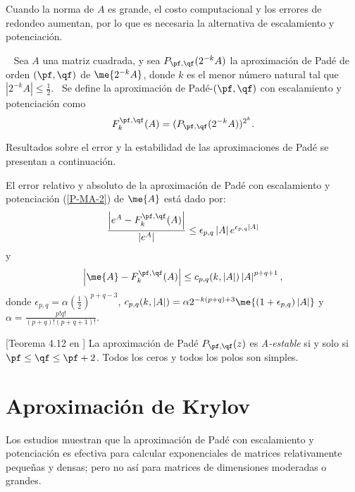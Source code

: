 Cuando la norma de $A$ es grande, el costo computacional  y los errores de redondeo aumentan, por lo que
es necesaria la alternativa de escalamiento y potenciaci\'on.

\begin{definition}\cite{Golub96}~
    Sea $A$ una matriz cuadrada, y sea $P_{\pf,\qf}(2^{-k}A%
    )$ la aproximaci\'{o}n de Pad\'{e} de orden $(\pf,\qf)\ $de $\me{2^{-k}A%
    }$, donde $k$ es el menor número natural tal que $\left\vert 2^{-k}A%
    \right\vert \leq \frac{1}{2}$. \ Se define la aproximación de  Pad\'{e}-$(\pf,\qf)$ con escalamiento y potenciación como 
    \begin{equation}
    F_{k}^{\pf,\qf}(A)=(P_{\pf,\qf}(2^{-k}A))^{2^{k}}.
    \label{P-MA-2}
    \end{equation}
\end{definition}

Resultados sobre el error y la estabilidad de las aproximaciones de Padé se presentan a continuación.

\begin{theorem}
    \label{Conv. Pade}\cite{errorpade} El error
    relativo y absoluto de la aproximaci\'on de Pad\'{e} con escalamiento y
    potenciaci\'on (\ref{P-MA-2}) de $\me{A}$ est\'{a} dado por: 
    \[
    \frac{\left\vert e^{A}-F_{k}^{\pf,\qf}(A)\right\vert 
    }{\left\vert e^{A}\right\vert }\leq \epsilon _{p,q}\left\vert 
    A\right\vert e^{\epsilon _{p,q}\left\vert A\right\vert }
    \]%
    y 
    \begin{equation}
    \left\vert \me{A}-F_{k}^{\pf,\qf}(A)\right\vert \leq
    c_{p,q}(k,\left\vert A\right\vert )\left\vert A\right\vert
    ^{p+q+1}, \label{errpade}
    \end{equation}
    donde $\epsilon _{p,q}=\alpha (\frac{1}{2})^{p+q-3}$, $%
    c_{p,q}(k,\left\vert A\right\vert )=\alpha
    2^{-k(p+q)+3}\me{(1+\epsilon _{p,q})\left\vert A\right\vert }$ y $%
    \alpha =\frac{p!q!}{(p+q)!(p+q+1)!}$.
\end{theorem}

\begin{theorem}\label{Stab. Pade}[Teorema 4.12 en \cite{Hairer-Wanner96}] 
    La aproximaci\'on de Pad\'e $P_{\pf,\qf}(z)$  es \emph{A-estable} si y solo si $\pf\leq \qf\leq \pf+2$. 
    Todos los ceros y todos los polos son simples.
\end{theorem}

\section{Aproximación de Krylov\label{section:Krylov-sp}}
Los estudios muestran que la aproximaci\'on de Pad\'e con escalamiento y potenciaci\'on
es efectiva para calcular exponenciales de matrices relativamente peque\~nas y densas; pero no as\'i para matrices de dimensiones moderadas o grandes.

